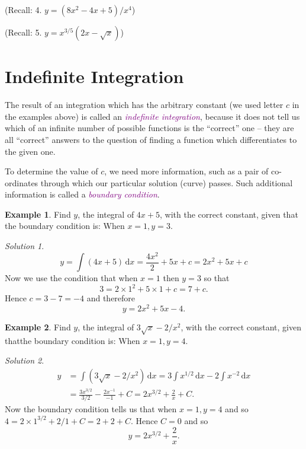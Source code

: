 \documentclass[
  english,
  11pt,
  oneside]{book}
\newcommand{\slide}{}
\theoremstyle{definition}
\theoremstyle{definition}
\newtheorem{example}{Example}[chapter]
\theoremstyle{definition}
\theoremstyle{definition}
\theoremstyle{remark}
\newtheorem*{solution}{Solution}
\begin{document}
\begin{slidesonly}

\slide

(Recall: 4. \(y=(8x^2-4x+5)/x^4\))

\slide

(Recall: 5. \(y=x^{3/5}(2x-\sqrt{x})\))
\slide

\end{slidesonly}

\section{Indefinite Integration}\label{indefinite-integration}

The result of an integration which has the arbitrary constant (we used letter \(c\) in the examples above) is called an \textcolor{purple}{\em indefinite integration}, because it does not tell us which of an infinite number of possible functions is the ``correct'' one -- they are all ``correct'' answers to the question
of finding a function which differentiates to the given one.

To determine the value of \(c\), we need more information, such as a pair of co-ordinates through which our particular solution (curve) passes. Such additional information is called a \textcolor{purple}{\em boundary condition}.

\slide

\begin{example}
Find \(y\), the integral of \(4x + 5\), with the correct constant, given that the boundary condition is:
When \(x = 1, y = 3\).
\end{example}

\begin{solution}
\[y = \int(4x+5)\,\mathrm{d}x = \frac{4x^2}{2} + 5x+c = 2x^2+5x+c\]
Now we use the condition that when \(x=1\) then \(y=3\) so that
\[3 = 2\times 1^2 + 5\times1 + c = 7+c.\]
Hence \(c = 3-7=-4\) and therefore
\[y = 2x^2+5x-4.\]
\end{solution}

\slide

\begin{example}
Find \(y\), the integral of \(3\sqrt{x} - 2/x^2\), with the correct constant, given thatthe boundary condition is:
When \(x = 1, y = 4\).
\end{example}

\begin{solution}
\begin{align*}
y& = \int(3\sqrt{x}-2/x^2)\,\mathrm{d}x = 3\int x^{1/2}\,\mathrm{d}x - 2\int x^{-2}\,\mathrm{d}x\\
&= \frac{3x^{3/2}}{3/2} - \frac{2x^{-1}}{-1}+C = 2x^{3/2}+\frac2x+C.
\end{align*}
Now the boundary condition tells us that when \(x=1, y = 4\) and so \(4=2\times1^{3/2}+2/1+C = 2+2+C\). Hence \(C=0\) and so
\[y = 2x^{3/2}+\frac 2x.\]
\end{solution}
\end{document}
